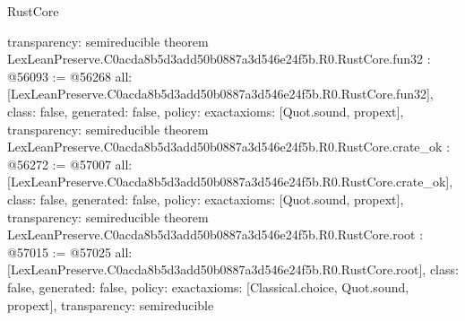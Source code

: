 \begin{lexlean}{RustCore}
\begin{coremodule}
{  transparency: semireducible
}
theorem LexLeanPreserve.C0acda8b5d3add50b0887a3d546e24f5b.R0.RustCore.fun32 : @56093 := @56268 {
  all: [LexLeanPreserve.C0acda8b5d3add50b0887a3d546e24f5b.R0.RustCore.fun32],
  class: false,
  generated: false,
  policy: exact{axioms: [Quot.sound, propext]},
  transparency: semireducible
}
theorem LexLeanPreserve.C0acda8b5d3add50b0887a3d546e24f5b.R0.RustCore.crate_ok : @56272 := @57007 {
  all: [LexLeanPreserve.C0acda8b5d3add50b0887a3d546e24f5b.R0.RustCore.crate_ok],
  class: false,
  generated: false,
  policy: exact{axioms: [Quot.sound, propext]},
  transparency: semireducible
}
theorem LexLeanPreserve.C0acda8b5d3add50b0887a3d546e24f5b.R0.RustCore.root : @57015 := @57025 {
  all: [LexLeanPreserve.C0acda8b5d3add50b0887a3d546e24f5b.R0.RustCore.root],
  class: false,
  generated: false,
  policy: exact{axioms: [Classical.choice, Quot.sound, propext]},
  transparency: semireducible
}


\end{coremodule}
\end{lexlean}
